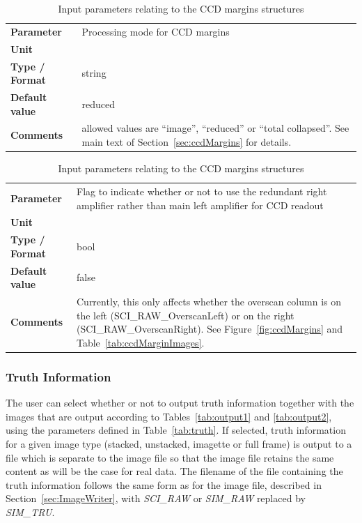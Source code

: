 \documentclass[11pt]{article}      %
\def\HCode#1{}
\def\htmlanchor#1{\HCode{<a id="#1"></a>}}
\begin{document}
\begin{table}[hb]
  \caption{Input parameters relating to the CCD margins structures}

  \begin{tabular}{| l | p{13cm} |}
    \hline 
    {\bf Parameter} & Processing mode for CCD margins\\
    {\bf Unit} & \\
    {\bf Type / Format} & string\\
    {\bf Default value} & reduced\\
    {\bf Comments} & allowed values are ``image'', ``reduced'' or ``total collapsed''. See main text of Section~\ref{sec:ccdMargins} for details.\\
    \hline
  \end{tabular}
  \bigskip

  \htmlanchor{readoutHardware}
  \begin{tabular}{| l | p{13cm} |}
    \hline 
    {\bf Parameter} & Flag to indicate whether or not to use the redundant right amplifier rather than main left amplifier for CCD readout\\
    {\bf Unit} & \\
    {\bf Type / Format} & bool\\
    {\bf Default value} & false\\
    {\bf Comments} & Currently, this only affects whether the overscan column is on the left (SCI\_RAW\_OverscanLeft) or on the right (SCI\_RAW\_OverscanRight). See Figure~\ref{fig:ccdMargins} and Table~\ref{tab:ccdMarginImages}.\\
    \hline
  \end{tabular}
  \bigskip

  \label{tab:ccdMargins}
\end{table}

\clearpage

\htmlanchor{TruthData}
\subsubsection{Truth Information}
\label{sec:truth}

The user can select whether or not to output truth information together with the images that are output according to Tables~\ref{tab:output1} and \ref{tab:output2}, using the parameters defined in Table~\ref{tab:truth}. If selected, truth information for a given image type (stacked, unstacked, imagette or full frame) is output to a file which is separate to the image file so that the image file retains the same content as will be the case for real data. The filename of the file containing the truth information follows the same form as for the image file, described in Section~\ref{sec:ImageWriter}, with {\it SCI\_RAW} or {\it SIM\_RAW} replaced by {\it SIM\_TRU}.
\end{document}
